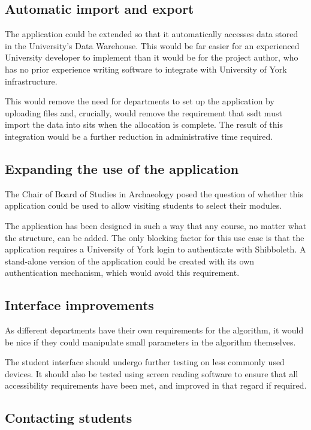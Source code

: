 \documentclass[draft]{scrartcl}
\begin{document}
\subsection{Automatic import and export}
\label{sec:autoexport}

The application could be extended so that it automatically accesses data
stored in the University's Data Warehouse. This would be far easier for an
experienced University developer to implement than it would be for the project
author, who has no prior experience writing software to integrate with
University of York infrastructure.

This would remove the need for departments to set up the application by
uploading files and, crucially, would remove the requirement that \gls{ssdt}
must import the data into \gls{sits} when the allocation is complete. The
result of this integration would be a further reduction in administrative time
required.

\subsection{Expanding the use of the application}

The Chair of Board of Studies in Archaeology posed the question of whether
this application could be used to allow visiting students to select their
modules.

The application has been designed in such a way that any course, no matter
what the structure, can be added. The only blocking factor for this use case
is that the application requires a University of York login to authenticate
with Shibboleth. A stand-alone version of the application could be created
with its own authentication mechanism, which would avoid this requirement.

\subsection{Interface improvements}

As different departments have their own requirements for the algorithm, it
would be nice if they could manipulate small parameters in the algorithm
themselves.

The student interface should undergo further testing on less commonly used
devices. It should also be tested using screen reading software to ensure that
all accessibility requirements have been met, and improved in that regard if
required.

\subsection{Contacting students}
\end{document}
